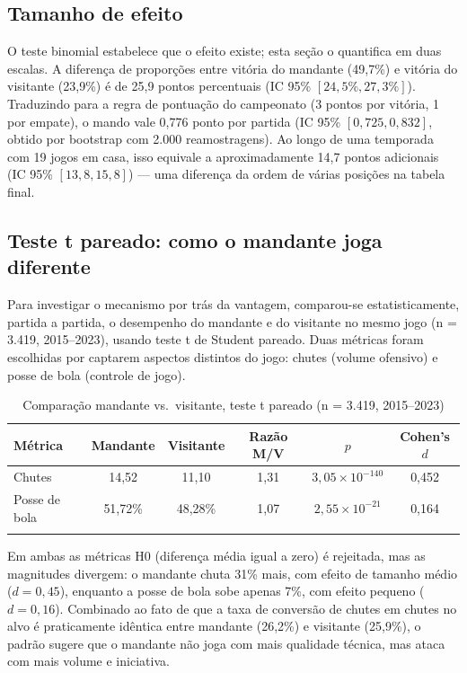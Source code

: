 \documentclass[pdflatex,sn-mathphys-num]{sn-jnl}%
\theoremstyle{thmstyleone}%
\theoremstyle{thmstyletwo}%
\theoremstyle{thmstylethree}%
\begin{document}
\subsection{Tamanho de efeito}\label{subsec_efeito}

O teste binomial estabelece que o efeito existe; esta seção o quantifica em duas escalas. A diferença de proporções entre vitória do mandante (49,7\%) e vitória do visitante (23,9\%) é de 25,9 pontos percentuais (IC 95\% $[24{,}5\%, 27{,}3\%]$). Traduzindo para a regra de pontuação do campeonato (3 pontos por vitória, 1 por empate), o mando vale 0,776 ponto por partida (IC 95\% $[0{,}725, 0{,}832]$, obtido por bootstrap com 2.000 reamostragens). Ao longo de uma temporada com 19 jogos em casa, isso equivale a aproximadamente 14,7 pontos adicionais (IC 95\% $[13{,}8, 15{,}8]$) --- uma diferença da ordem de várias posições na tabela final.

\subsection{Teste t pareado: como o mandante joga diferente}\label{subsec_tpareado}

Para investigar o mecanismo por trás da vantagem, comparou-se estatisticamente, partida a partida, o desempenho do mandante e do visitante no mesmo jogo (n = 3.419, 2015--2023), usando teste t de Student pareado. Duas métricas foram escolhidas por captarem aspectos distintos do jogo: chutes (volume ofensivo) e posse de bola (controle de jogo).

\begin{table}[h]
\caption{Comparação mandante vs.\ visitante, teste t pareado (n = 3.419, 2015--2023)}\label{tab_tpareado}
\begin{tabular}{@{}lccccc@{}}
\toprule
Métrica & Mandante & Visitante & Razão M/V & $p$ & Cohen's $d$\\
\midrule
Chutes         & 14,52 & 11,10 & 1,31 & $3{,}05\times10^{-140}$ & 0,452\\
Posse de bola  & 51,72\% & 48,28\% & 1,07 & $2{,}55\times10^{-21}$ & 0,164\\
\botrule
\end{tabular}
\end{table}

Em ambas as métricas H0 (diferença média igual a zero) é rejeitada, mas as magnitudes divergem: o mandante chuta 31\% mais, com efeito de tamanho médio ($d = 0{,}45$), enquanto a posse de bola sobe apenas 7\%, com efeito pequeno ($d = 0{,}16$). Combinado ao fato de que a taxa de conversão de chutes em chutes no alvo é praticamente idêntica entre mandante (26,2\%) e visitante (25,9\%), o padrão sugere que o mandante não joga com mais qualidade técnica, mas ataca com mais volume e iniciativa.
\end{document}
